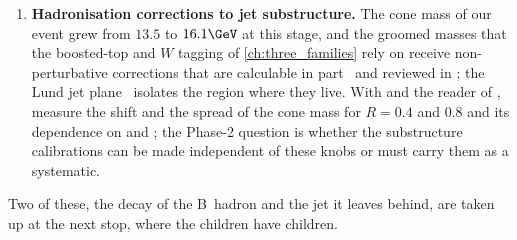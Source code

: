 \begin{enumerate}
     log prints for a thousand hadronisations and test whether it
    reproduces the cone \pt and mass of
    \cref{tab:children_getting_married:numbers}; the Phase-2 question is
    whether such a model, fitted to hadron spectra inside jets, can be
    tuned to data as a whole rather than knob by knob, within the
    computing budget of \cite{HSFPhysicsEventGeneratorWG:2020gxw}.
  \item \textbf{Hadronisation corrections to jet substructure.} The cone
    mass of our event grew from $13.5$ to $16.1\GeV$ at this stage, and
    the groomed masses that the boosted-top and $W$ tagging of
    \cref{ch:three_families} rely on receive non-perturbative corrections
    that are calculable in part~\cite{Hoang:2019ceu} and reviewed in
    \cite{Larkoski:2017jix}; the Lund jet plane~\cite{Dreyer:2018nbf}
    isolates the region where they live. With  and the
    reader of , measure the shift and the spread
    of the cone mass for $R=0.4$ and $0.8$ and its dependence on
     and ; the Phase-2 question is whether the
    substructure calibrations can be made independent of these knobs or
    must carry them as a systematic.
\end{enumerate}
Two of these, the decay of the B~hadron and the jet it leaves behind, are
taken up at the next stop, where the children have children.
